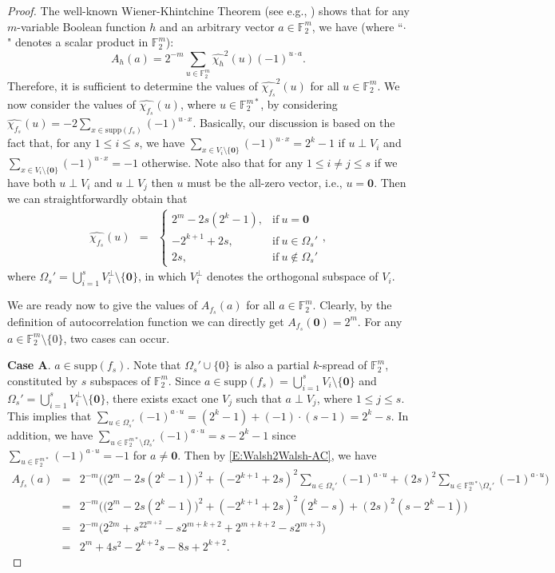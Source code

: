 \documentclass[10pt]{article}
\newcommand{\F}{\mathbb{F}}
\newcommand{\0}{\textbf{0}}
\newcommand{\1}{\textbf{1}}
\newcommand{\W}[2][]{\widehat{\chi_{#2}}^{#1}}
\begin{document}
\begin{proof}
The well-known Wiener-Khintchine Theorem (see e.g., \cite{Carl93}) shows that for any
$m$-variable Boolean function $h$ and an arbitrary vector $a\in\F_2^m$, we have (where ``$\cdot$" denotes a scalar product in $\F_2^m$):
\begin{equation}\label{E:Walsh2Walsh-AC}
A_h(a)=2^{-m}\sum_{u\in\F_2^m} \widehat{\chi_h}^2(u)(-1)^{u\cdot a}.
\end{equation}
Therefore, it is sufficient to determine the values of $\widehat{\chi_{f_s}}^2(u)$ for all $u\in\F_2^m$.
We now consider the values of $\W {f_s}(u)$,  where $u \in \F_2^{m*}$, by considering $\W{f_s}(u)=-2\sum_{x\in\mathrm{supp}(f_s)}(-1)^{u\cdot x}$.
Basically, our discussion is based on the fact that, for any $1\leq i\leq s$, we have
$\sum_{x\in V_i\setminus\{\0\}} (-1)^{u\cdot x}=2^k-1$ if
$u \perp V_i$ and $\sum_{x\in V_i\setminus\{\0\}} (-1)^{u\cdot x}=-1$ otherwise.
Note also that for any $1\leq i\neq j\leq s$ if we have both $u \perp V_i$ and $u \perp V_j$
then $u$ must be the all-zero vector, i.e., $u=\0$.
Then we can straightforwardly obtain that
\begin{eqnarray}\label{E:WalshPS}
\W{f_s}(u)
&=& \left\{
\begin{array}{llllll}
2^m-2s(2^k-1),&\mathrm{if~}u=\0\\
-2^{k+1}+2s,&\mathrm{if~}u\in  \Omega_s'\\
2s,&\mathrm{if~}u\not\in \Omega_s'
\end{array}
\right.,
\end{eqnarray}
where $\Omega_s'=\bigcup_{i=1}^sV_i^\bot\setminus \{\0\}$,
in which $V_i^\bot$ denotes the orthogonal subspace of $V_i$.

We are ready now to give the values of $A_{f_s}(a)$ for all $a\in\F_2^m$.
Clearly, by the definition of autocorrelation function we can directly get $A_{f_s}(\0)=2^m$.
For any $a\in\F_2^m\setminus\{0\}$, two cases can occur.

\textbf{Case A}.  $a\in\mathrm{supp}(f_s)$. Note that $\Omega_s'\cup \{0\}$ is also a partial $k$-spread of $\F_2^m$,
constituted by $s$ subspaces of $\F_2^m$. Since $a\in\mathrm{supp}(f_s)=\bigcup_{i=1}^s V_i\setminus\{\0\}$
and $\Omega_s'=\bigcup_{i=1}^sV_i^\bot\setminus \{\0\}$, there exists exact one $V_j$ such that
$a\perp  V_j$, where $1\leq j \leq s$. This implies that $\sum_{u\in\Omega_s'}(-1)^{a \cdot u}=(2^k-1)+(-1)\cdot(s-1)=2^k-s$.
In addition, we have $\sum_{u\in\F_2^{m*}\setminus\Omega_s'}(-1)^{a \cdot u}=s-2^k-1$ since
$\sum_{u\in\F_2^{m*}}(-1)^{a \cdot u}=-1$ for $a\ne\0$.
Then by \eqref{E:Walsh2Walsh-AC}, we have
\begin{eqnarray*}
A_{f_s}(a)&=&2^{-m}\bigg(\big(2^m-2s(2^k-1)\big)^2+(-2^{k+1}+2s)^2\sum_{u\in\Omega_s'}(-1)^{a \cdot u}+(2s)^2\sum_{u\in\F_2^{m*}\setminus\Omega_s'}(-1)^{a \cdot u}\bigg)\\
&=&2^{-m}\bigg(\big(2^m-2s(2^k-1)\big)^2+(-2^{k+1}+2s)^2(2^k-s)+(2s)^2(s-2^k-1)\bigg)\\
&=& 2^{-m}\bigg(2^{2m}+s^22^{m+2}-s2^{m+k+2}+2^{m+k+2}-s2^{m+3}\bigg)\\
&=&2^m+4s^2-2^{k+2}s-8s+2^{k+2}.
\end{eqnarray*}


\end{proof}
\end{document}
